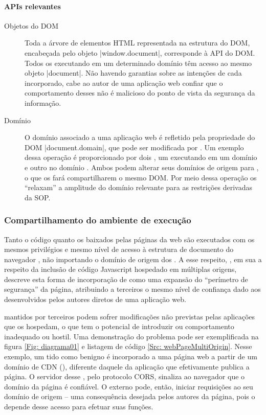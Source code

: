 \paragraph{APIs relevantes} %
\label{par:apis_relevantes}

\begin{description}
	\item[Objetos do DOM ] Toda a árvore de elementos HTML representada na estrutura do DOM, encabeçada pelo objeto |window.document|, corresponde à API  do DOM. Todos os \scripts{} executando em um determinado domínio têm acesso ao mesmo objeto |document|. Não havendo garantias sobre as intenções de cada \script{} incorporado, cabe ao autor de uma aplicação web confiar que o comportamento desses \scripts{} não é malicioso do ponto de vista da segurança da informação.
	\item[Domínio] O domínio associado a uma aplicação web é refletido pela propriedade do DOM |document.domain|, que pode ser modificada por \scripts{}. Um exemplo dessa operação é proporcionado por dois \scripts{}, um executando em um domínio  e outro no domínio . Ambos podem alterar seus domínios de origem para , o que os fará compartilharem o mesmo DOM. Por meio dessa operação os \scripts{} ``relaxam'' a amplitude do domínio relevante para as restrições derivadas da SOP.
\end{description}



\subsubsection{Compartilhamento do ambiente de execução}
Tanto o código  quanto os {\scripts} baixados pelas páginas da web são executados com os mesmos privilégios e mesmo nível de acesso à estrutura de documento do navegador \cite[p. 2-3]{DeRyck2012}, não importando o domínio de origem dos {\scripts}. A esse respeito, , em sua  a respeito da inclusão de código Javascript hospedado em múltiplas origens, descreve esta forma de incorporação de {\scripts} como uma expansão do ``perímetro de segurança'' da página, atribuindo a terceiros o mesmo nível de confiança dado aos {\scripts} desenvolvidos pelos autores diretos de uma aplicação web.

{\Scripts} mantidos por terceiros podem sofrer modificações não previstas pelas aplicações que os hospedam, o que tem o potencial de introduzir  ou comportamento inadequado ou hostil. Uma demonstração do problema pode ser exemplificada na figura \ref{Fig: diagrama01} e listagem de código \ref{Src: webPageMultiOrigin}. Nesse exemplo, um {\script} tido como benigno é incorporado a uma página web a partir de um domínio de CDN (), diferente daquele da aplicação que efetivamente publica a página. O servidor desse {\script}, pelo protocolo CORS, sinaliza ao navegador que o domínio da página é confiável. O {\script} externo pode, então, iniciar requisições ao seu domínio de origem -- uma consequência desejada pelos autores da página, pois o {\script} depende desse acesso para efetuar suas funções.

